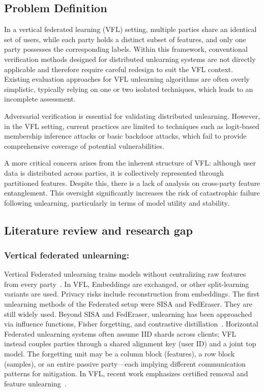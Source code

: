 \documentclass[sigconf,nonacm]{acmart}
\begin{document}
\subsection{Problem Definition}

In a vertical federated learning (VFL) setting, multiple parties share an identical set of users, while each party holds a distinct subset of features, and only one party possesses the corresponding labels. Within this framework, conventional verification methods designed for distributed unlearning systems are not directly applicable and therefore require careful redesign to suit the VFL context. Existing evaluation approaches for VFL unlearning algorithms are often overly simplistic, typically relying on one or two isolated techniques, which leads to an incomplete assessment.

Adversarial verification is essential for validating distributed unlearning. However, in the VFL setting, current practices are limited to techniques such as logit-based membership inference attacks\cite{varshney2025vfu} or basic backdoor attacks\cite{yang2019federated}, which fail to provide comprehensive coverage of potential vulnerabilities.

A more critical concern arises from the inherent structure of VFL: although user data is distributed across parties, it is collectively represented through partitioned features. Despite this, there is a lack of analysis on cross-party feature entanglement. This oversight significantly increases the risk of catastrophic failure following unlearning, particularly in terms of model utility and stability.




\subsection{Literature review and research gap}
\subsubsection{Vertical federated unlearning: }
Vertical Federated unlearning trains models without centralizing raw features from every party~\cite{yang2019federated}. In VFL, Embeddings are exchanged, or other split-learning variants are used. Privacy risks include reconstruction from embeddings. The first unlearning methods of the Federated setup were SISA and FedEraser. They are still widely used. Beyond SISA and FedEraser, unlearning has been approached via influence functions, Fisher forgetting, and contrastive distillation~\cite{bourtoule2021sisa,guo2019certified}. Horizontal Federated unlearning systems often assume IID shards across clients; VFL instead couples parties through a shared alignment key (user ID) and a joint top model. The forgetting unit may be a column block (features), a row block (samples), or an entire passive party---each implying different communication patterns for mitigation. In VFL, recent work emphasizes certified removal and feature unlearning~\cite{wang2025certified,varshney2025vfu}. 
\end{document}

